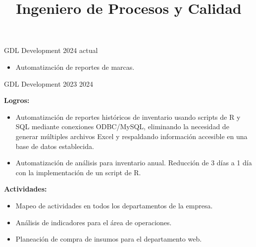 \documentclass{simplecv}
\title{Ingeniero de Procesos y Calidad}
\begin{document}
\setmainfont{XCharter} %
\setsansfont{Inter} %
\nocite{*}
\thispagestyle{firstpage}

{\small

}
{\small\sffamily\setlength{\parskip}{6pt}%

}\vspace{0.75em}


    {GDL Development}
    {}
    {2024}
    {actual}
    {
        \begin{itemize}[leftmargin=*]
        \setlength{\itemsep}{0cm}
            \item Automatización de reportes de marcas.
        \end{itemize}
    }

    {GDL Development}
    {}
    {2023}
    {2024}
    {
        \textbf{Logros:}
        \begin{itemize}[leftmargin=*]
        \setlength{\itemsep}{0cm}
            \item Automatización de reportes históricos de inventario usando scripts de R y SQL mediante conexiones ODBC/MySQL, eliminando la necesidad de generar múltiples archivos Excel y respaldando información accesible en una base de datos establecida.
            \item Automatización de análisis para inventario anual. Reducción de 3 días a 1 día con la implementación de un script de R.
        \end{itemize}

        \textbf{Actividades:}
        \begin{itemize}[leftmargin=*]
        \setlength{\itemsep}{0cm}
            \item Mapeo de actividades en todos los departamentos de la empresa.
            \item Análisis de indicadores para el área de operaciones.
            \item Planeación de compra de insumos para el departamento web.
        \end{itemize}
    }
\end{document}
